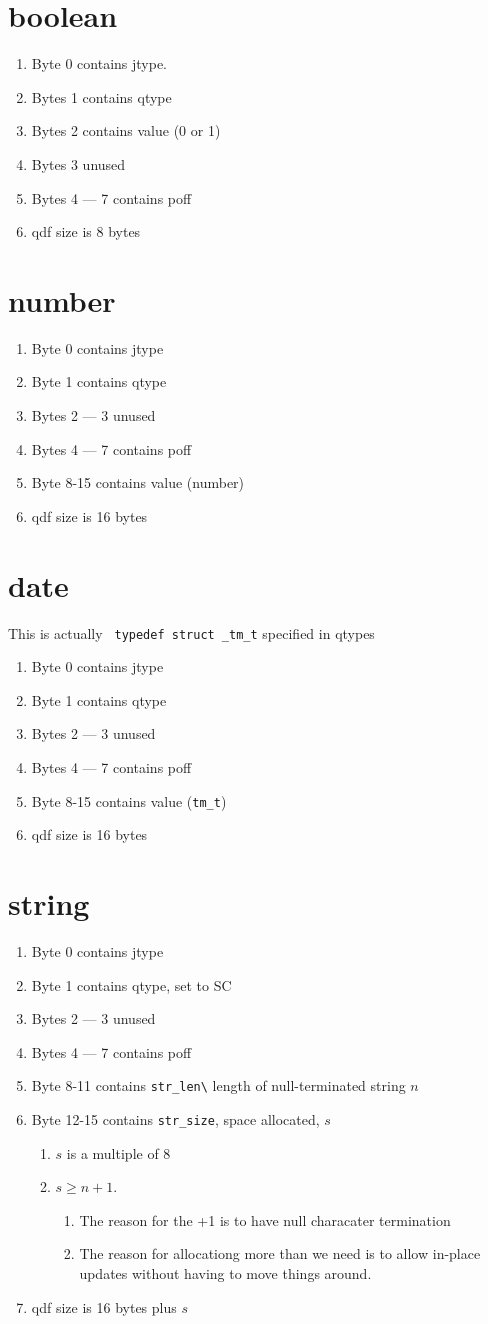 \documentclass[letterpaper,12pt]{article}
\newcommand{\be}{\begin{enumerate}}
\newcommand{\ee}{\end{enumerate}}
\begin{document}
\section{boolean}
\be
\item Byte 0  contains jtype.
\item Bytes 1 contains qtype
\item Bytes 2 contains value (0 or 1)
\item Bytes 3  unused
\item Bytes 4 --- 7  contains poff
\item qdf size is 8 bytes 
  \ee

\section{number}
\be
\item Byte 0 contains jtype
\item Byte 1 contains qtype
\item Bytes 2 --- 3  unused
\item Bytes 4 --- 7  contains poff
\item Byte 8-15 contains value (number)
\item qdf size is 16 bytes 
  \ee
\section{date}
This is actually \verb+ typedef struct _tm_t+ specified in qtypes
\be
\item Byte 0 contains jtype
\item Byte 1 contains qtype
\item Bytes 2 --- 3  unused
\item Bytes 4 --- 7  contains poff
\item Byte 8-15 contains value (\verb+tm_t+)
\item qdf size is 16 bytes 
  \ee
\section{string}
\be
\item Byte 0 contains jtype
\item Byte 1 contains qtype, set to SC
\item Bytes 2 --- 3  unused
\item Bytes 4 --- 7  contains poff
\item Byte 8-11 contains \verb+str_len\+ length of null-terminated string \(n\)
\item Byte 12-15 contains \verb+str_size+, space allocated, \(s\)
  \be
\item \(s\) is a multiple of 8
\item \(s \geq n+1\). 
  \be
\item The reason for the +1 is to have null characater termination
\item The reason for allocationg more than we 
need is to allow in-place updates without having to move things around.
\ee
\ee
\item qdf size is 16 bytes plus \(s\)
  \ee
\end{document}
